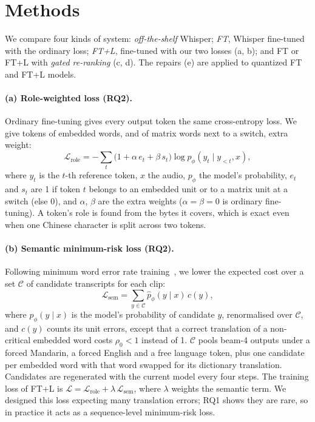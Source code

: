 \section{Methods}
\label{sec:methods}

We compare four kinds of system: \emph{off-the-shelf} Whisper; \emph{FT}, Whisper fine-tuned with the ordinary loss; \emph{FT+L}, fine-tuned with our two losses (a, b); and FT or FT+L with \emph{gated re-ranking} (c, d). The repairs (e) are applied to quantized FT and FT+L models.

\paragraph{(a) Role-weighted loss (RQ2).}
Ordinary fine-tuning gives every output token the same cross-entropy loss. We give tokens of embedded words, and of matrix words next to a switch, extra weight:
\begin{equation}
  \mathcal{L}_{\text{role}} = -\sum_{t} \bigl(1 + \alpha\, e_t + \beta\, s_t\bigr) \log p_\phi(y_t \mid y_{<t}, x),
\end{equation}
where $y_t$ is the $t$-th reference token, $x$ the audio, $p_\phi$ the model's probability, $e_t$ and $s_t$ are 1 if token $t$ belongs to an embedded unit or to a matrix unit at a switch (else 0), and $\alpha$, $\beta$ are the extra weights ($\alpha=\beta=0$ is ordinary fine-tuning). A token's role is found from the bytes it covers, which is exact even when one Chinese character is split across two tokens.

\paragraph{(b) Semantic minimum-risk loss (RQ2).}
Following minimum word error rate training~\citep{prabhavalkar2018mwer}, we lower the expected cost over a set $\mathcal{C}$ of candidate transcripts for each clip:
\begin{equation}
  \mathcal{L}_{\text{sem}} = \sum_{y \in \mathcal{C}} \hat{p}_\phi(y \mid x)\, c(y),
\end{equation}
where $\hat{p}_\phi(y \mid x)$ is the model's probability of candidate $y$, renormalised over $\mathcal{C}$, and $c(y)$ counts its unit errors, except that a correct translation of a non-critical embedded word costs $\rho_0<1$ instead of 1. $\mathcal{C}$ pools beam-4 outputs under a forced Mandarin, a forced English and a free language token, plus one candidate per embedded word with that word swapped for its dictionary translation. Candidates are regenerated with the current model every four steps. The training loss of FT+L is $\mathcal{L} = \mathcal{L}_{\text{role}} + \lambda\, \mathcal{L}_{\text{sem}}$, where $\lambda$ weights the semantic term. We designed this loss expecting many translation errors; RQ1 shows they are rare, so in practice it acts as a sequence-level minimum-risk loss.


